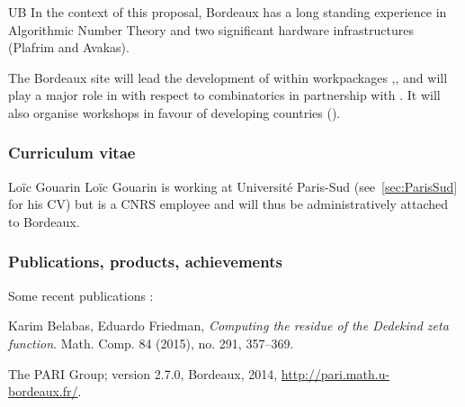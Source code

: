 \begin{sitedescription}{UB}
\medskip
In the context of this proposal, Bordeaux has a long standing experience in
Algorithmic Number Theory and two significant hardware infrastructures
(Plafrim and Avakas).

The Bordeaux site will lead the development of \PariGP within
workpackages ,,  and will play
a major role in  with respect to combinatorics in partnership with .
It will also organise workshops in favour of developing countries ().

\subsubsection*{Curriculum vitae}







\begin{participant}[type=R,PM=6,gender=male,salary=5600]{Lo\"ic Gouarin}
  Loïc Gouarin is working at Université Paris-Sud
  (see~\ref{sec:ParisSud} for his CV) but is a CNRS employee and will
  thus be administratively attached to Bordeaux.
\end{participant}



\subsubsection*{Publications, products, achievements}

Some recent publications :
\begin{compactenum}
\item 
Karim Belabas, Eduardo Friedman,
\textit{Computing the residue of the Dedekind zeta function}.
Math. Comp. 84 (2015), no. 291, 357--369. 

\item
The PARI Group; \PariGP version 2.7.0, Bordeaux, 2014,
\url{http://pari.math.u-bordeaux.fr/}.


\end{compactenum}
\end{sitedescription}
